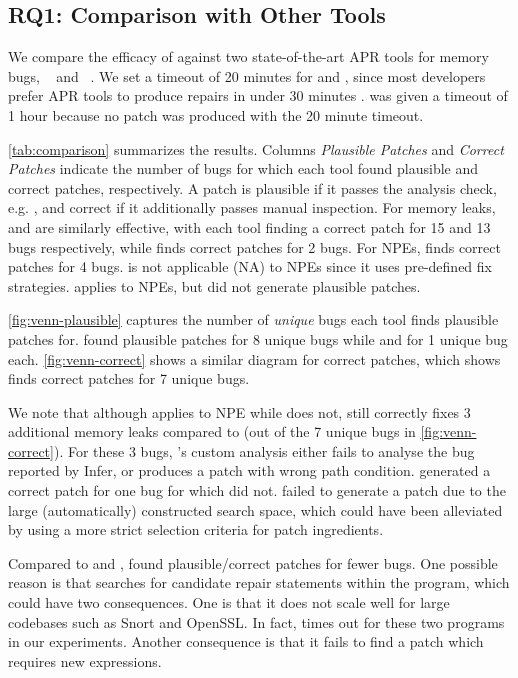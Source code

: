 \subsection{RQ1: Comparison with Other Tools}
\label{sec:rq1}



We compare the efficacy of \tool against two state-of-the-art APR tools for memory bugs, \saver~\cite{HongLLO20} and \footpatch~\cite{TonderG18}. 
We set a timeout of 20 minutes for \tool and \saver, since most developers prefer APR tools to produce repairs in under 30 minutes \cite{noller2022trust}.
\footpatch was given a timeout of 1 hour because no patch was produced with the 20 minute timeout.

\autoref{tab:comparison} summarizes the results. 
Columns \emph{Plausible Patches} and \emph{Correct Patches} indicate the number of bugs for which each tool found plausible and correct patches, respectively.
A patch is plausible if it passes the analysis check, e.g. \pulse, and correct if it additionally passes manual inspection.
For memory leaks, \tool and \saver are similarly effective, with each tool finding a correct patch for 15 and 13 bugs respectively, while \footpatch finds correct patches for 2 bugs.
For NPEs, \tool finds correct patches for 4 bugs. \saver is not applicable (NA) to NPEs since it uses pre-defined fix strategies. \footpatch applies to NPEs, but did not generate plausible patches.


\autoref{fig:venn-plausible} captures the number of \textit{unique} bugs each tool finds plausible patches for. 
\tool found plausible patches for 8 unique bugs while \saver and \footpatch for 1 unique bug each. 
\autoref{fig:venn-correct} shows a similar diagram for correct patches, which shows \tool finds correct patches for 7 unique bugs.

We note that although \tool applies to NPE while \saver does not, \tool still correctly fixes 3 additional memory leaks compared to \saver (out of the 7 unique bugs in \autoref{fig:venn-correct}).
For these 3 bugs, \saver's custom analysis either fails to analyse the bug reported by Infer, or produces a patch with wrong path condition.
\saver generated a correct patch for one bug
for which \tool did not. \tool failed to generate a patch 
due to the large (automatically) constructed search space, which could have been alleviated by using a more strict selection criteria for patch ingredients.

Compared to \tool and \saver, \footpatch found plausible/correct patches for fewer bugs.
One possible reason is that \footpatch searches for candidate repair statements within the program, which could have two consequences. One is that it does not scale well for large codebases such as Snort and OpenSSL.
In fact, \footpatch times out for these two programs in our experiments.
Another consequence is that it fails to find a patch which requires new expressions.

